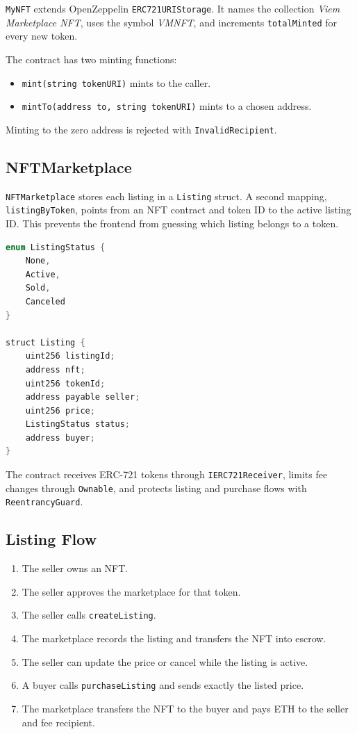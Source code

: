 \documentclass[11pt,a4paper]{article}
\newcommand{\code}[1]{\texttt{#1}}
\begin{document}
\code{MyNFT} extends OpenZeppelin \code{ERC721URIStorage}. It names the collection \textit{Viem Marketplace NFT}, uses the symbol \textit{VMNFT}, and increments \code{totalMinted} for every new token.

The contract has two minting functions:

\begin{itemize}
    \item \code{mint(string tokenURI)} mints to the caller.
    \item \code{mintTo(address to, string tokenURI)} mints to a chosen address.
\end{itemize}

Minting to the zero address is rejected with \code{InvalidRecipient}.

\subsection{NFTMarketplace}

\code{NFTMarketplace} stores each listing in a \code{Listing} struct. A second mapping, \code{listingByToken}, points from an NFT contract and token ID to the active listing ID. This prevents the frontend from guessing which listing belongs to a token.

\begin{lstlisting}[style=contractstyle, language=Java, caption={Listing state stored by the marketplace.}]
enum ListingStatus {
    None,
    Active,
    Sold,
    Canceled
}

struct Listing {
    uint256 listingId;
    address nft;
    uint256 tokenId;
    address payable seller;
    uint256 price;
    ListingStatus status;
    address buyer;
}
\end{lstlisting}

The contract receives ERC-721 tokens through \code{IERC721Receiver}, limits fee changes through \code{Ownable}, and protects listing and purchase flows with \code{ReentrancyGuard}.

\subsection{Listing Flow}

\begin{enumerate}
    \item The seller owns an NFT.
    \item The seller approves the marketplace for that token.
    \item The seller calls \code{createListing}.
    \item The marketplace records the listing and transfers the NFT into escrow.
    \item The seller can update the price or cancel while the listing is active.
    \item A buyer calls \code{purchaseListing} and sends exactly the listed price.
    \item The marketplace transfers the NFT to the buyer and pays ETH to the seller and fee recipient.
\end{enumerate}
\end{document}
